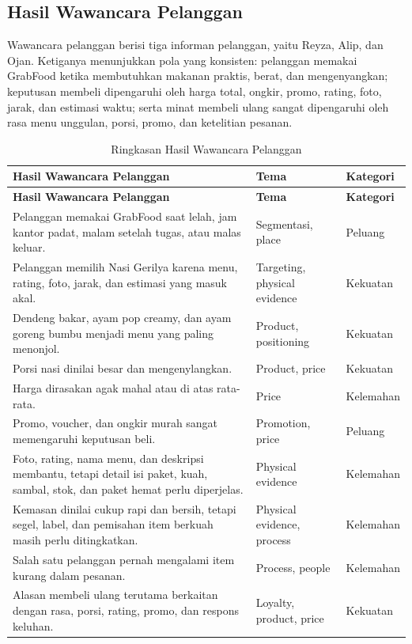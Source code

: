 \subsection{Hasil Wawancara Pelanggan}
Wawancara pelanggan berisi tiga informan pelanggan, yaitu Reyza, Alip, dan Ojan. Ketiganya menunjukkan pola yang konsisten: pelanggan memakai GrabFood ketika membutuhkan makanan praktis, berat, dan mengenyangkan; keputusan membeli dipengaruhi oleh harga total, ongkir, promo, rating, foto, jarak, dan estimasi waktu; serta minat membeli ulang sangat dipengaruhi oleh rasa menu unggulan, porsi, promo, dan ketelitian pesanan.

\begingroup
    \scriptsize
    \begin{xltabular}{\textwidth}{|Y|Z{2.65cm}|Z{2.45cm}|}
        \caption{Ringkasan Hasil Wawancara Pelanggan}
        \label{tab:koding-wawancara-pelanggan-bab4}\\
        \toprule
        \textbf{Hasil Wawancara Pelanggan} & \textbf{Tema} & \textbf{Kategori} \\ \hline
        \midrule
        \endfirsthead
        \toprule
        \textbf{Hasil Wawancara Pelanggan} & \textbf{Tema} & \textbf{Kategori} \\ \hline
        \midrule
        \endhead
        \endfoot
        \bottomrule
        \endlastfoot
        Pelanggan memakai GrabFood saat lelah, jam kantor padat, malam setelah tugas, atau malas keluar. & Segmentasi, place & Peluang \\ \hline
        Pelanggan memilih Nasi Gerilya karena menu, rating, foto, jarak, dan estimasi yang masuk akal. & Targeting, physical evidence & Kekuatan \\ \hline
        Dendeng bakar, ayam pop creamy, dan ayam goreng bumbu menjadi menu yang paling menonjol. & Product, positioning & Kekuatan \\ \hline
        Porsi nasi dinilai besar dan mengenylangkan. & Product, price & Kekuatan \\ \hline
        Harga dirasakan agak mahal atau di atas rata-rata. & Price & Kelemahan \\ \hline
        Promo, voucher, dan ongkir murah sangat memengaruhi keputusan beli. & Promotion, price & Peluang \\ \hline
        Foto, rating, nama menu, dan deskripsi membantu, tetapi detail isi paket, kuah, sambal, stok, dan paket hemat perlu diperjelas. & Physical evidence & Kelemahan \\ \hline
        Kemasan dinilai cukup rapi dan bersih, tetapi segel, label, dan pemisahan item berkuah masih perlu ditingkatkan. & Physical evidence, process & Kelemahan \\ \hline
        Salah satu pelanggan pernah mengalami item kurang dalam pesanan. & Process, people & Kelemahan \\ \hline
        Alasan membeli ulang terutama berkaitan dengan rasa, porsi, rating, promo, dan respons keluhan. & Loyalty, product, price & Kekuatan \\ \hline
    \end{xltabular}
\endgroup

